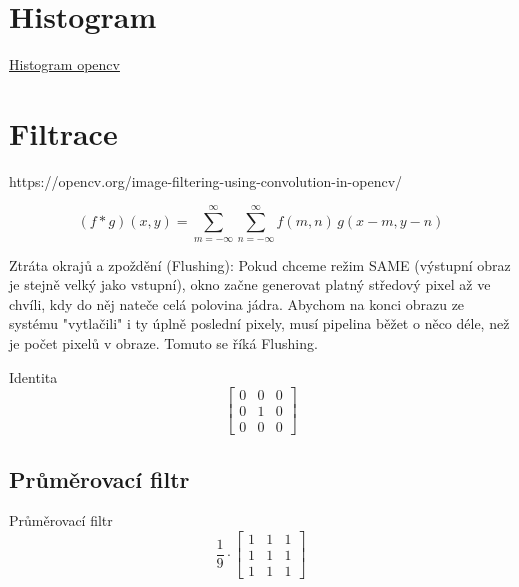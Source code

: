 \subsection{}

\section{Histogram}

\href{https://docs.opencv.org/3.4/d4/d1b/tutorial_histogram_equalization.html}{Histogram opencv}
\section{Filtrace}

https://opencv.org/image-filtering-using-convolution-in-opencv/

\begin{equation}
    (f * g)(x, y) = \sum_{m=-\infty}^{\infty} \sum_{n=-\infty}^{\infty} f(m, n)\, g(x - m, y - n)
    \label{eq:placeholder_label}
\end{equation}

Ztráta okrajů a zpoždění (Flushing): Pokud chceme režim SAME (výstupní obraz je stejně velký jako vstupní), okno začne generovat platný středový pixel až ve chvíli, kdy do něj nateče celá polovina jádra. Abychom na konci obrazu ze systému "vytlačili" i ty úplně poslední pixely, musí pipelina běžet o něco déle, než je počet pixelů v obraze. Tomuto se říká Flushing.

Identita
\begin{equation}
    \begin{bmatrix}
        0 & 0 & 0 \\
        0 & 1 & 0 \\
        0 & 0 & 0
    \end{bmatrix}
\end{equation}

\subsection{Průměrovací filtr}
Průměrovací filtr
\begin{equation}
    \frac{1}{9} \cdot 
    \begin{bmatrix}
        1 & 1 & 1 \\
        1 & 1 & 1 \\
        1 & 1 & 1
    \end{bmatrix}
\end{equation}

